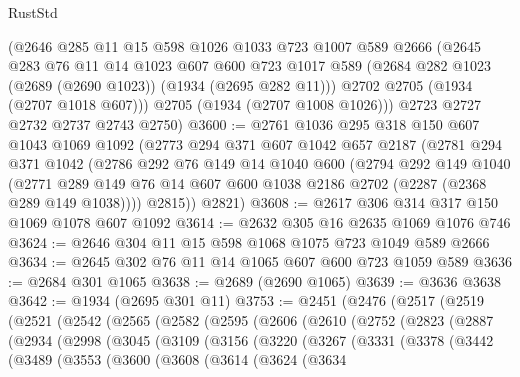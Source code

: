 \begin{lexlean}{RustStd}
\begin{coremodule}
      (@2646
        @285
        @11
        @15
        @598
        @1026
        @1033
        @723
        @1007
        @589
        @2666
        (@2645
          @283
          @76
          @11
          @14
          @1023
          @607
          @600
          @723
          @1017
          @589
          (@2684 @282 @1023 (@2689 (@2690 @1023)) (@1934 (@2695 @282 @11)))
          @2702
          @2705
          (@1934 (@2707 @1018 @607)))
        @2705
        (@1934 (@2707 @1008 @1026)))
      @2723
      @2727
      @2732
      @2737
      @2743
      @2750)
@3600 := @2761
    @1036
    @295
    @318
    @150
    @607
    @1043
    @1069
    @1092
    (@2773
      @294
      @371
      @607
      @1042
      @657
      @2187
      (@2781
        @294
        @371
        @1042
        (@2786
          @292
          @76
          @149
          @14
          @1040
          @600
          (@2794
            @292
            @149
            @1040
            (@2771 @289 @149 @76 @14 @607 @600 @1038 @2186 @2702 (@2287 (@2368 @289 @149 @1038))))
          @2815))
      @2821)
@3608 := @2617 @306 @314 @317 @150 @1069 @1078 @607 @1092
@3614 := @2632 @305 @16 @2635 @1069 @1076 @746
@3624 := @2646 @304 @11 @15 @598 @1068 @1075 @723 @1049 @589 @2666
@3634 := @2645 @302 @76 @11 @14 @1065 @607 @600 @723 @1059 @589
@3636 := @2684 @301 @1065
@3638 := @2689 (@2690 @1065)
@3639 := @3636 @3638
@3642 := @1934 (@2695 @301 @11)
@3753 := @2451
    (@2476
      (@2517
        (@2519
          (@2521
            (@2542
              (@2565
                (@2582
                  (@2595
                    (@2606
                      (@2610
                        (@2752
                          (@2823
                            (@2887
                              (@2934
                                (@2998
                                  (@3045
                                    (@3109
                                      (@3156
                                        (@3220
                                          (@3267
                                            (@3331
                                              (@3378
                                                (@3442
                                                  (@3489
                                                    (@3553
                                                      (@3600
                                                        (@3608
                                                          (@3614
                                                            (@3624
                                                              (@3634

\end{coremodule}
\end{lexlean}
